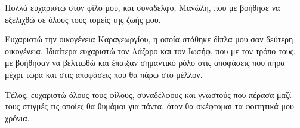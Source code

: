Πολλά ευχαριστώ στον φίλο μου, και συνάδελφο, Μανώλη, που με βοήθησε να 
εξελιχθώ σε όλους τους τομείς της ζωής μου.

Ευχαριστώ την οικογένεια Καραγεωργίου, η οποία στάθηκε δίπλα μου σαν 
δεύτερη οικογένεια.
Ιδιαίτερα ευχαριστώ τον Λάζαρο και τον Ιωσήφ, που με τον τρόπο τους, 
με βοήθησαν να βελτιωθώ και έπαιξαν σημαντικό ρόλο στις αποφάσεις 
που πήρα μέχρι τώρα και στις αποφάσεις που θα πάρω στο μέλλον.

Τέλος, ευχαριστώ όλους τους φίλους, συναδέλφους και γνωστούς που πέρασα 
μαζί τους στιγμές τις οποίες θα θυμάμαι για πάντα,
όταν θα σκέφτομαι τα φοιτητικά μου χρόνια.


\clearpage
